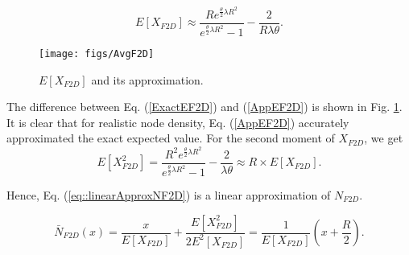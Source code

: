 \documentclass[12pt, draftclsnofoot, onecolumn]{IEEEtran}
\begin{document}
\begin{equation}
\label{AppEF2D}
	E[X_{F2D}] \approx \frac{R e^{\frac{\theta}{2} \lambda R^2} }{e^{ \frac{\theta}{2}\lambda R^2}-1} -  \frac{2}{R\lambda \theta}.
\end{equation}

\begin{figure}
\centering
\texttt{[image: figs/AvgF2D]}
\caption{$E[X_{F2D}]$ and its approximation.}
\label{ExactAndAppOfEF2D}
\end{figure}

The difference between Eq. (\ref{ExactEF2D}) and (\ref{AppEF2D}) 
is shown in Fig. \ref{ExactAndAppOfEF2D}. It is clear that for realistic node density,
Eq. (\ref{AppEF2D}) accurately approximated the exact expected value.
For the second moment of $X_{F2D}$, we get
\begin{equation}
	E[X^2_{F2D}] = \frac{R^2 e^{\frac{\theta}{2} \lambda R^2} }{e^{ \frac{\theta}{2}\lambda R^2}-1} -  \frac{2}{\lambda \theta} \approx R\times E[X_{F2D}] .
\end{equation}

Hence, Eq. (\ref{eq::linearApproxNF2D}) is a linear approximation of $N_{F2D}$.

\begin{equation}
\label{eq::linearApproxNF2D}
	\bar{N}_{F2D} (x) =  \frac{x}{E[X_{F2D}]} + \frac{E[X^2_{F2D}]}{2E^2[X_{F2D}]} = \frac{1}{E[X_{F2D}]} (x+\frac{R}{2}).
\end{equation}



\end{document}

